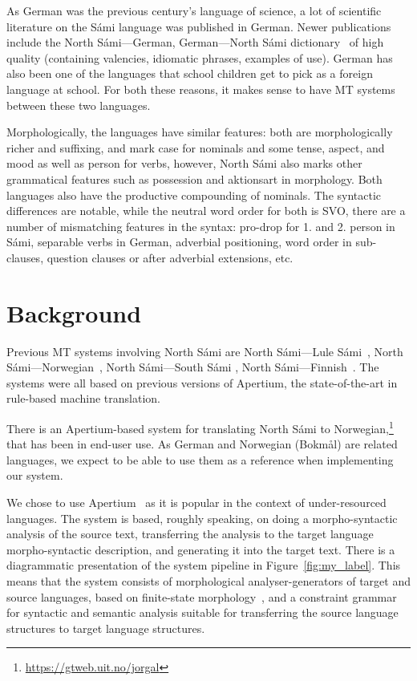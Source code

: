 \documentclass{flammie}
\begin{document}
As German was the previous century's language of science, a lot of scientific
literature on the Sámi language was published in German. Newer publications
include the North Sámi---German, German---North Sámi
dictionary~\cite{Sammallahti2006sami} of high quality (containing valencies,
idiomatic phrases, examples of use).  German has also been one of the languages
that school children get to pick as a foreign language at school.  For both
these reasons, it makes sense to have MT systems between these two languages.

Morphologically, the languages have similar features: both are morphologically
richer and suffixing, and mark case for nominals and some tense, aspect, and
mood as well as person for verbs, however, North Sámi also marks other
grammatical features such as possession and aktionsart in morphology. Both
languages also have the productive compounding of nominals.  The syntactic
differences are notable, while the neutral word order for both is SVO, there are
a number of mismatching features in the syntax: pro-drop for 1. and 2. person in
Sámi, separable verbs in German, adverbial positioning, word order in
sub-clauses, question clauses or after adverbial extensions, etc.

\section{Background}

Previous MT systems involving North Sámi are North Sámi---Lule
Sámi~\cite{tyers2009developing,Wiechetek2010shooting}, North
Sámi---Norwegian~\cite{trosterud2012evaluating}, North Sámi---South Sámi
\cite{Antonsen2017northsaami}, North
Sámi---Finnish~\cite{johnson2017north}.  The systems were all based on
previous versions of Apertium, the state-of-the-art in rule-based machine
translation.

There is an Apertium-based system for translating North Sámi to
Norwegian,\footnote{\url{https://gtweb.uit.no/jorgal}} that has been in end-user
use.  As German and Norwegian (Bokmål) are related languages, we expect to be
able to use them as a reference when implementing our system.


We chose to use Apertium~\cite{khanna2021recent} as it is popular in the
context of under-resourced languages.  The system is based, roughly speaking, on
doing a morpho-syntactic analysis of the source text, transferring the analysis
to the target language morpho-syntactic description, and generating it into the
target text.  There is a diagrammatic presentation of the system pipeline in
Figure~\ref{fig:my_label}.  This means that the system consists of morphological
analyser-generators of target and source languages, based on finite-state
morphology~\cite{Beesley2003finite}, and a constraint
grammar~\cite{karlsson1990constraint,Didriksen2016constraint} for syntactic and
semantic analysis suitable for transferring the source language structures to
target language structures.
\end{document}
